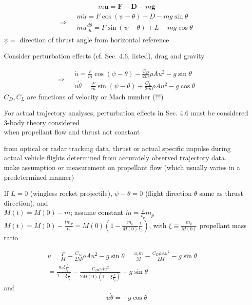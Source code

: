 \documentclass[10pt]{amsart}
\begin{document}
\begin{multicols*}{2}
\[
m \dot{\mathbf{u}} = \mathbf{F} - \mathbf{D} - m\mathbf{g}
\]
\[
\begin{gathered}
  \Longrightarrow \begin{aligned} & m \dot{u} = F\cos{(\psi - \theta) } - D - mg \sin{\theta}   \\
    & mu \frac{d\theta}{dt} = F\sin{(\psi - \theta) } + L - mg \cos{\theta} \end{aligned}
\end{gathered}
\]
$\psi = $ direction of thrust angle from horizontal reference

Consider perturbation effects (cf. Sec. 4.6, listed), drag and gravity

\[
\Longrightarrow \begin{aligned}
  & \dot{u} = \frac{F}{m} \cos{ (\psi - \theta) } - \frac{C_D}{2m} \rho Au^2 - g\sin{\theta} \\ 
  & u\dot{\theta} = \frac{F}{m} \sin{(\psi-\theta) } + \frac{C_L}{2m} \rho Au^2 - g\cos{\theta}
\end{aligned}
\]
$C_D,C_L$ are functions of velocity or Mach number (!!!)

For actual trajectory analyses, perturbation effects in Sec. 4.6 must be considered \\
\phantom{\quad \, } 3-body theory considered \\
\phantom{\quad \, } when propellant flow and thrust not constant 

from optical or radar tracking data, thrust or actual specific impulse during actual vehicle flights determined from accurately observed trajectory data. \\
\phantom{\quad \, } make assumption or measurement on propellant flow (which usually varies in a predetermined manner)

If $L=0$ (wingless rocket projectile), $\psi -\theta=0$ (flight direction $\theta$ same as thrust direction), and \\
$M(t) = M(0) - \dot{m}$; assume constant $\dot{m} = \frac{t}{t_p} m_p$ \\
$M(t) = M(0) - \frac{tm_p}{t_p} = M(0) ( 1 - \frac{m_p}{M(0)} \frac{t}{t_p} )$, with $\xi \equiv \frac{m_p}{M(0)}$ propellant mass ratio

\[
\begin{gathered}
  \dot{u} = \frac{F}{M} - \frac{C_D}{2M} \rho Au^2 - g\sin{\theta} = \frac{u_e \dot{m} }{ M} - \frac{C_D \rho Au^2}{2M} - g\sin{\theta} = \\
  = \frac{ u_e \xi \frac{t}{t_p} }{ 1 - \xi \frac{t}{t_p} }  - \frac{C_D \rho Au^2}{ 2M(0) ( 1 - \xi \frac{t}{t_p} ) } - g\sin{\theta}
\end{gathered}
\]
and 
\[
u\dot{\theta} = -g\cos{\theta}
\]


\end{multicols*}
\end{document}

